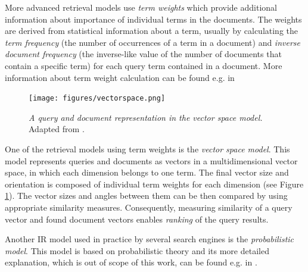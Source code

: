More advanced retrieval models use \textit{term weights} which provide additional information about importance of individual terms in the documents.
The weights are derived from statistical information about a term, usually by calculating the \textit{term frequency} (the number of occurrences of a term in a document) and \textit{inverse document frequency} (the inverse-like value of the number of documents that contain a specific term) for each query term contained in a document.
More information about term weight calculation can be found e.g. in \cite{hiemstra2001using,ManningRaghavanSchuetze08}

\begin{figure}[h!]
	\centering
		\texttt{[image: figures/vectorspace.png]}
	\caption{\textit{A query and document representation in the vector space model.} Adapted from \cite{hiemstra2001using}.}
	\label{fig:vectorspace}
\end{figure}

One of the retrieval models using term weights is the \textit{vector space model}. 
This model represents queries and documents as vectors in a multidimensional vector space, in which each dimension belongs to one term.
The final vector size and orientation is composed of individual term weights for each dimension (see Figure \ref{fig:vectorspace}).
The vector sizes and angles between them can be then compared by using appropriate similarity measures.
Consequently, measuring similarity of a query vector and found document vectors enables \textit{ranking} of the query results.

Another IR model used in practice by several search engines is the \textit{probabilistic model}. 
This model is based on probabilistic theory and its more detailed explanation, which is out of scope of this work, can be found e.g. in \cite{van1979information}. 






